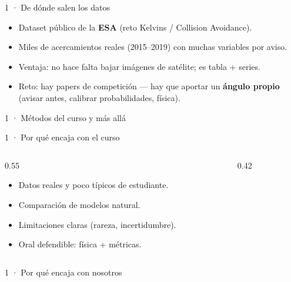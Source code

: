 \begin{frame}{1 · De dónde salen los datos}
  \begin{itemize}
    \item Dataset público de la \textbf{ESA} (reto Kelvins / Collision Avoidance).
    \item Miles de acercamientos reales (2015--2019) con muchas variables por aviso.
    \item Ventaja: no hace falta bajar imágenes de satélite; es tabla + series.
    \item Reto: hay papers de competición --- hay que aportar un \textbf{ángulo propio} (avisar antes, calibrar probabilidades, física).
  \end{itemize}
\end{frame}

\begin{frame}{1 · Métodos del curso y más allá}
\end{frame}

\begin{frame}{1 · Por qué encaja con el curso}
  \begin{columns}[T]
    \begin{column}{0.55\textwidth}
      \begin{itemize}
        \item Datos reales y poco típicos de estudiante.
        \item Comparación de modelos natural.
        \item Limitaciones claras (rareza, incertidumbre).
        \item Oral defendible: física + métricas.
      \end{itemize}
    \end{column}
    \begin{column}{0.42\textwidth}
    \end{column}
  \end{columns}
\end{frame}

\begin{frame}{1 · Por qué encaja con nosotros}
\end{frame}

